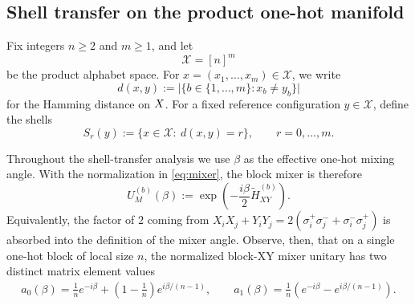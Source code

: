 \documentclass[a4paper,onecolumn,11pt,unpublished]{quantumarticle}
\theoremstyle{remark}
\begin{document}
\subsection{Shell transfer on the product one-hot manifold}
\label{subsec:shell-transfer-product-space}

Fix integers \(n\ge2\) and \(m\ge1\), and let
\[
\mathcal X=[n]^m
\]
be the product alphabet space. For \(x=(x_1,\dots,x_m)\in \mathcal X\), we write
\[
d(x,y):=\bigl|\{b\in\{1,\dots,m\}:x_b\neq y_b\}\bigr|
\]
for the Hamming distance on \(\mathcal \mathcal X\). For a fixed reference configuration
\(y\in \mathcal X\), define the shells
\begin{equation}
\label{eq:shells}
S_r(y):=\{x\in \mathcal X:\ d(x,y)=r\},
\qquad r=0,\dots,m.
\end{equation}

Throughout the shell-transfer analysis we use \(\beta\) as the effective
one-hot mixing angle. With the normalization in
\cref{eq:mixer}, the block mixer is therefore
\begin{equation}
\label{eq:mixer-unitary}
U_M^{(b)}(\beta)
:=
\exp\!\left(
-\frac{i\beta}{2}\widetilde H_{XY}^{(b)}
\right).
\end{equation}
Equivalently, the factor of \(2\) coming from
\(X_iX_j+Y_iY_j=2(\sigma_i^+\sigma_j^-+\sigma_i^-\sigma_j^+)\) is absorbed into the definition of the mixer angle. Observe, then, that on a single one-hot block of local size \(n\), the normalized block-XY mixer unitary has two distinct matrix element values
\begin{align}
\label{eq:block}
a_0(\beta)
=
\frac{1}{n}e^{-i\beta}
+
\left(1-\frac{1}{n}\right)e^{i\beta/(n-1)},
\qquad
a_1(\beta)
=
\frac{1}{n}\left(e^{-i\beta}-e^{i\beta/(n-1)}\right).
\end{align}
\end{document}

